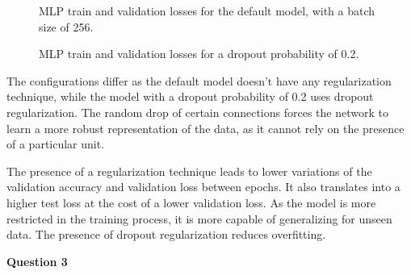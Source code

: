 \documentclass[12pt]{article}
\begin{document}
\begin{enumerate}[leftmargin=\labelsep]
\begin{enumerate}[label=\alph*)]
                    \begin{figure}[H]
                        \centering
                        
                        \caption{MLP train and validation losses for the default model, with a batch size of 256.}
                        \label{fig:q2-mlp-training-loss-batch-256-lr-0.01-epochs-150-hidden-200-dropout-0.0-l2-0.0-layers-2-act-relu-opt-sgd}
                    \end{figure}

                    \begin{figure}[H]
                        \centering
                        
                        \caption{MLP train and validation losses for a dropout probability of 0.2.}
                        \label{fig:q2-mlp-training-loss-batch-256-lr-0.01-epochs-150-hidden-200-dropout-0.2-l2-0.0-layers-2-act-relu-opt-sgd}
                    \end{figure}

                    The configurations differ as the default model doesn't have any regularization technique, while the model with a dropout probability of 0.2 uses dropout regularization. The random drop of certain connections forces the network to learn a more robust representation of the data, as it cannot rely on the presence of a particular unit.

                    \vspace{12pt}

                    The presence of a regularization technique leads to lower variations of the validation accuracy and validation loss between epochs. It also translates into a higher test loss at the cost of a lower validation loss. As the model is more restricted in the training process, it is more capable of generalizing for unseen data. The presence of dropout regularization reduces overfitting.

                    \vspace{12pt}

          \end{enumerate}
\end{enumerate}

\center\large{\textbf{Question 3}}
\end{document}
